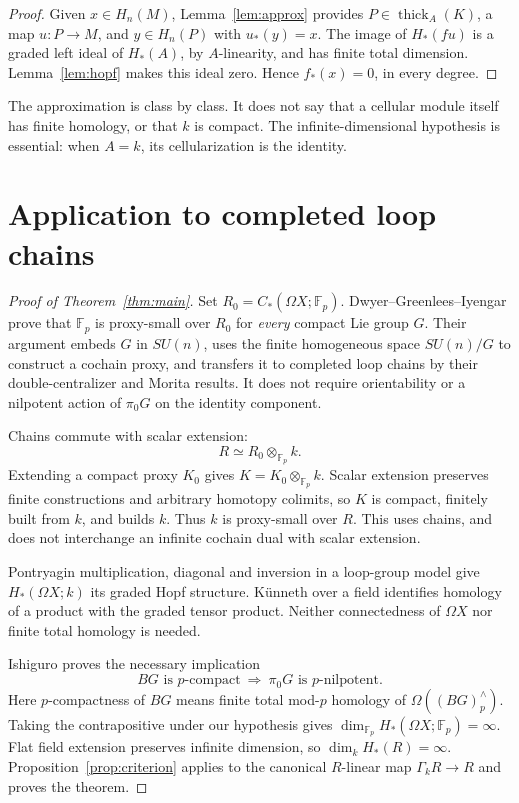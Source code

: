 \documentclass[11pt]{article}
\newcommand{\thick}{\operatorname{thick}}
\newcommand{\Fp}{\mathbb F_p}
\newcommand{\Gam}{\Gamma_k}
\begin{document}
\begin{proof}
Given \(x\in H_n(M)\), Lemma~\ref{lem:approx} provides \(P\in\thick_A(K)\), a map \(u:P\to M\), and \(y\in H_n(P)\) with \(u_*(y)=x\). The image of \(H_*(fu)\) is a graded left ideal of \(H_*(A)\), by \(A\)-linearity, and has finite total dimension. Lemma~\ref{lem:hopf} makes this ideal zero. Hence \(f_*(x)=0\), in every degree.
\end{proof}

The approximation is class by class. It does not say that a cellular module itself has finite homology, or that \(k\) is compact. The infinite-dimensional hypothesis is essential: when \(A=k\), its cellularization is the identity.

\section{Application to completed loop chains}

\begin{proof}[Proof of Theorem~\ref{thm:main}]
Set \(R_0=C_*(\Omega X;\Fp)\). Dwyer--Greenlees--Iyengar \cite[\S5.7, p.~382]{DGI} prove that \(\Fp\) is proxy-small over \(R_0\) for \emph{every} compact Lie group \(G\). Their argument embeds \(G\) in \(SU(n)\), uses the finite homogeneous space \(SU(n)/G\) to construct a cochain proxy, and transfers it to completed loop chains by their double-centralizer and Morita results. It does not require orientability or a nilpotent action of \(\pi_0G\) on the identity component.

Chains commute with scalar extension:
\[
R\simeq R_0\otimes_{\Fp} k.
\]
Extending a compact proxy \(K_0\) gives \(K=K_0\otimes_{\Fp}k\). Scalar extension preserves finite constructions and arbitrary homotopy colimits, so \(K\) is compact, finitely built from \(k\), and builds \(k\). Thus \(k\) is proxy-small over \(R\). This uses chains, and does not interchange an infinite cochain dual with scalar extension.

Pontryagin multiplication, diagonal and inversion in a loop-group model give \(H_*(\Omega X;k)\) its graded Hopf structure. K\"unneth over a field identifies homology of a product with the graded tensor product. Neither connectedness of \(\Omega X\) nor finite total homology is needed.

Ishiguro \cite[Proposition 1.3(a), p.~199]{Ishiguro} proves the necessary implication
\[
BG\text{ is }p\text{-compact}\ \Longrightarrow\
\pi_0G\text{ is }p\text{-nilpotent}.
\]
Here \(p\)-compactness of \(BG\) means finite total mod-\(p\) homology of \(\Omega((BG)^\wedge_p)\). Taking the contrapositive under our hypothesis gives
\(\dim_{\Fp}H_*(\Omega X;\Fp)=\infty\).
Flat field extension preserves infinite dimension, so
\(\dim_kH_*(R)=\infty\).
Proposition~\ref{prop:criterion} applies to the canonical \(R\)-linear map \(\Gam R\to R\) and proves the theorem.
\end{proof}
\end{document}

